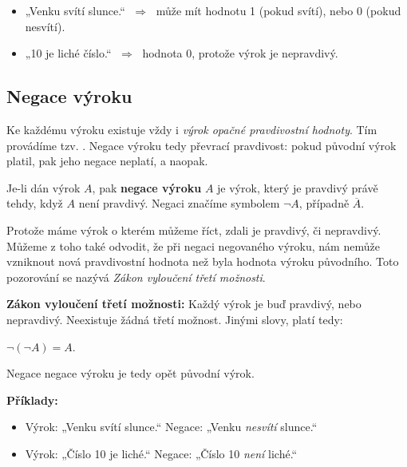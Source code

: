 \documentclass[12pt,a4paper]{article}
\begin{document}
\begin{examplebox}
\begin{itemize}
    \item „Venku svítí slunce.“ $\;\Rightarrow\;$ může mít hodnotu 1 (pokud svítí), nebo 0 (pokud nesvítí).  
    \item „10 je liché číslo.“ $\;\Rightarrow\;$ hodnota 0, protože výrok je nepravdivý.  
\end{itemize}
\end{examplebox}
\subsection{Negace výroku}

Ke každému výroku existuje vždy i \emph{výrok opačné pravdivostní hodnoty}.  
Tím provádíme tzv. .  
Negace výroku tedy převrací pravdivost: pokud původní výrok platil, pak jeho negace neplatí, a naopak.  

\begin{definitionbox}
Je-li dán výrok $A$, pak \textbf{negace výroku} $A$ je výrok, který je pravdivý právě tehdy, když $A$ není pravdivý.  
Negaci značíme symbolem $\neg A$, případně $\overline{A}$.
\end{definitionbox}

Protože máme výrok o kterém můžeme říct, zdali je pravdivý, či nepravdivý. 
Můžeme z toho také odvodit, že při negaci negovaného výroku, nám nemůže vzniknout 
nová pravdivostní hodnota než byla hodnota výroku původního. Toto pozorování se nazývá \emph{Zákon vyloučení třetí možnosti}.

\begin{notebox}
\textbf{Zákon vyloučení třetí možnosti:}  
Každý výrok je buď pravdivý, nebo nepravdivý. Neexistuje žádná třetí možnost.  
Jinými slovy, platí tedy:
\begin{center}
    $\neg (\neg A) = A$.
\end{center} 
Negace negace výroku je tedy opět původní výrok.
\end{notebox}

\begin{examplebox}
\textbf{Příklady:}
\begin{itemize}
    \item Výrok: „Venku svítí slunce.“  
          Negace: „Venku \emph{nesvítí} slunce.“  
    \item Výrok: „Číslo 10 je liché.“  
          Negace: „Číslo 10 \emph{není} liché.“  
\end{itemize}
\end{examplebox}
\end{document}
